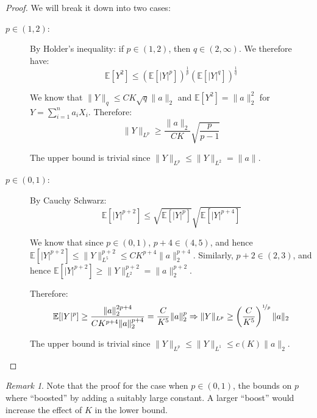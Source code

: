 \documentclass{article}
\theoremstyle{remark}
\newtheorem*{remark}{Remark}
\newcommand{\Exp}{\mathbb{E}}
\begin{document}
\begin{proof}
We will break it down into two cases:
\begin{description}
\item [\(p \in (1, 2)\):] By Holder's inequality: if \(p \in (1, 2)\), then \(q \in (2, \infty)\). We therefore have:
\begin{equation*}
\Exp[Y^{2}] \leq \left(\Exp\left[|Y|^{p}\right]\right)^{\frac{1}{p}} \left(\Exp\left[|Y|^{q}\right]\right)^{\frac{1}{q}}
\end{equation*}

We know that \(\|Y\|_{q} \leq CK\sqrt{q}\|a\|_{2}\) and \(\Exp[Y^{2}] = \|a\|_{2}^{2}\) for \(Y = \sum\limits_{i=1}^{n} a_{i}X_{i}\). Therefore:
\begin{equation*}
\|Y\|_{L^{p}} \geq \frac{\|a\|_{2}}{CK}\sqrt{\frac{p}{p - 1}}
\end{equation*}

The upper bound is trivial since \(\|Y\|_{L^{p}} \leq \|Y\|_{L^{2}} = \|a\|\).

\item [\(p \in (0, 1)\):] By Cauchy Schwarz:
\begin{equation*}
\Exp[|Y|^{p+2}] \leq \sqrt{\Exp[|Y|^{p}]}\sqrt{\Exp[|Y|^{p+4}]}
\end{equation*}

We know that since \(p \in (0, 1)\), \(p + 4 \in (4, 5)\), and hence \(\Exp[|Y|^{p+2}] \leq \|Y\|_{L^{5}}^{p+2} \leq CK^{p+4}\|a\|_{2}^{p+4}\).
Similarly, \(p + 2 \in (2, 3)\), and hence \(\Exp[|Y|^{p+2}] \geq \|Y\|_{L^{2}}^{p+2} = \|a\|_{2}^{p+2}\).

Therefore:
\begin{equation*}
\Exp[|Y|^{p}] \geq \frac{\|a\|_{2}^{2p + 4}}{CK^{p + 4}\|a\|_{2}^{p + 4}} = \frac{C}{K^{5}} \|a\|_{2}^{p} \Rightarrow \|Y\|_{L^{p}} \geq \left(\frac{C}{K^{5}}\right)^{\nicefrac{1}{p}} \|a\|_{2}
\end{equation*}

The upper bound is trivial since \(\|Y\|_{L^{p}} \leq \|Y\|_{L^{1}} \leq c(K)\|a\|_{2}\).
\end{description}
\end{proof}

\begin{remark}
Note that the proof for the case when \(p \in (0, 1)\), the bounds on \(p\) where ``boosted'' by adding a suitably large constant. A larger ``boost'' would increase the effect of \(K\) in the lower bound.
\end{remark}
\end{document}
